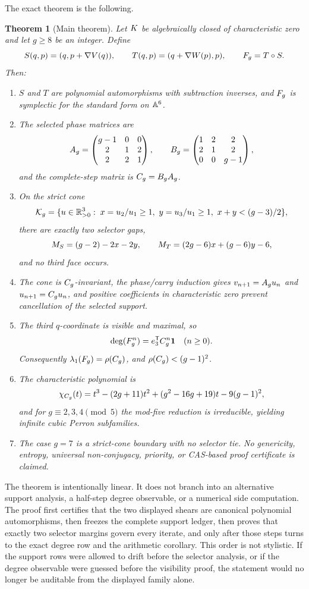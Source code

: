 \documentclass[11pt]{article}
\newtheorem{theorem}{Theorem}[section]
\theoremstyle{remark}
\numberwithin{equation}{section}
\begin{document}
The exact theorem is the following.

\begin{theorem}[Main theorem]\label{thm:main}
Let \(K\) be algebraically closed of characteristic zero and let
\(g\geq 8\) be an integer.  Define
\[
S(q,p)=(q,p+\nabla V(q)),\qquad
T(q,p)=(q+\nabla W(p),p),\qquad
F_g=T\circ S.
\]
Then:
\begin{enumerate}
\item \(S\) and \(T\) are polynomial automorphisms with subtraction inverses,
  and \(F_g\) is symplectic for the standard form on \(\mathbb{A}^6\).
\item The selected phase matrices are
  \[
  A_g=\begin{pmatrix}g-1&0&0\\2&1&2\\2&2&1\end{pmatrix},\qquad
  B_g=\begin{pmatrix}1&2&2\\2&1&2\\0&0&g-1\end{pmatrix},
  \]
  and the complete-step matrix is \(C_g=B_gA_g\).
\item On the strict cone
  \[
  \mathcal{K}_g=\{u\in\mathbb R_{>0}^3:\;x=u_2/u_1\geq 1,\ y=u_3/u_1\geq 1,\ x+y<(g-3)/2\},
  \]
  there are exactly two selector gaps,
  \[
  M_S=(g-2)-2x-2y,\qquad
  M_T=(2g-6)x+(g-6)y-6,
  \]
  and no third face occurs.
\item The cone is \(C_g\)-invariant, the phase/carry induction gives
  \(v_{n+1}=A_g u_n\) and \(u_{n+1}=C_g u_n\), and positive coefficients in
  characteristic zero prevent cancellation of the selected support.
\item The third \(q\)-coordinate is visible and maximal, so
  \[
  \operatorname{deg}(F_g^n)=e_3^{\mathsf T}C_g^n\mathbf{1} \quad (n\geq 0).
  \]
  Consequently \(\lambda_1(F_g)=\rho(C_g)\), and \(\rho(C_g)<(g-1)^2\).
\item The characteristic polynomial is
  \[
  \chi_{C_g}(t)=t^3-(2g+11)t^2+(g^2-16g+19)t-9(g-1)^2,
  \]
  and for \(g\equiv 2,3,4 \pmod 5\) the mod-five reduction is irreducible,
  yielding infinite cubic Perron subfamilies.
\item The case \(g=7\) is a strict-cone boundary with no selector tie.  No
  genericity, entropy, universal non-conjugacy, priority, or CAS-based proof
  certificate is claimed.
\end{enumerate}
\end{theorem}

The theorem is intentionally linear.  It does not branch into an alternative
support analysis, a half-step degree observable, or a numerical side
computation.  The proof first certifies that the two displayed shears are
canonical polynomial automorphisms, then freezes the complete support ledger,
then proves that exactly two selector margins govern every iterate, and only
after those steps turns to the exact degree row and the arithmetic corollary.
This order is not stylistic.  If the support rows were allowed to drift before
the selector analysis, or if the degree observable were guessed before the
visibility proof, the statement would no longer be auditable from the displayed
family alone.
\end{document}
